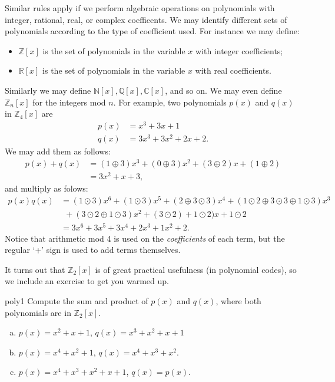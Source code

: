 Similar rules apply if we perform algebraic operations on polynomials with integer, rational, real, or complex coefficents. We may identify different sets of polynomials according to the type of coefficient used. For instance we may define:
\begin{itemize}
\item
$\mathbb{Z}[x]$ is the set of polynomials in the variable $x$ with integer coefficients;
\item
$\mathbb{R}[x]$ is the set of polynomials in the variable $x$ with real coefficients.
\end{itemize}
Similarly we may define $\mathbb{N}[x], \mathbb{Q}[x], \mathbb{C}[x]$, and so on. We may even define $\mathbb{Z}_n[x]$ for the integers mod $n$. For example, two polynomials $p(x)$ and $q(x)$ in $\mathbb{Z}_4[x]$ are
\begin{align*} 
p(x) & = x^3 + 3x +1 \\
q(x) & = 3x^3 + 3x^2 + 2x +2.
\end{align*}
We may add them as follows:
\begin{align*}
p(x) + q(x) &= (1\oplus 3)x^3 + (0\oplus 3)x^2 + (3\oplus 2)x + (1\oplus 2)\\
&= 3x^2 + x + 3,
\end{align*}
and multiply as folows:
\begin{align*}
p(x)  q(x) 
& =  (1 \odot 3)x^6 + (1 \odot 3)x^5 + (2\oplus 3\odot 3)x^4 + (1\odot 2 \oplus 3\odot 3 \oplus  1 \odot 3)x^3 \\
&~~+ (3 \odot 2 \oplus  1 \odot 3)x^2 + (3 \odot 2) + 1 \odot 2)x + 1\odot 2 \\
& = 3x^6 + 3x^5 + 3x^4 + 2x^3 + 1x^2 + 2.
\end{align*}
Notice that arithmetic mod 4 is used on the \emph{coefficients} of each term, but the regular `+' sign is used to add terms themselves.  

It turns out that $\mathbb{Z}_2[x]$ is of great practical usefulness (in polynomial codes), so we include an exercise to get you warmed up.

\begin{exercise}{poly1}
Compute the sum and product of $p(x)$ and $q(x)$, where both polynomials are in $\mathbb{Z}_2[x]$.
\begin{enumerate}[(a)]
\item
$p(x)= x^2 + x + 1$, $q(x)=x^3 +x^2+x+1$
\item
$p(x)= x^4 + x^2+1$, $q(x)=x^4 +x^3+x^2$.
\item
$p(x)= x^4 + x^3+x^2+x+1$, $q(x)=p(x)$.
\end{enumerate}
\end{exercise}

